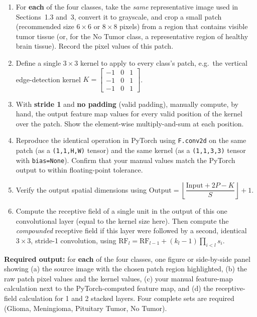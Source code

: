 \documentclass[12pt,a4paper]{article}
\begin{document}
\begin{stepbox}
\begin{enumerate}[leftmargin=*, label=\arabic*.]
  \item For \textbf{each} of the four classes, take the \emph{same} representative
        image used in Sections~1.3 and~3, convert it to grayscale, and crop a small
        patch (recommended size $6 \times 6$ or $8 \times 8$ pixels) from a region that
        contains visible tumor tissue (or, for the No Tumor class, a representative
        region of healthy brain tissue). Record the pixel values of this patch.
  \item Define a single $3 \times 3$ kernel to apply to every class's patch, e.g.\ the
        vertical edge-detection kernel
        $K = \begin{bmatrix}-1 & 0 & 1\\ -1 & 0 & 1\\ -1 & 0 & 1\end{bmatrix}$.
  \item With \textbf{stride 1} and \textbf{no padding} (valid padding), manually
        compute, by hand, the output feature map values for every valid position of
        the kernel over the patch. Show the element-wise multiply-and-sum at each
        position.
  \item Reproduce the identical operation in PyTorch using \texttt{F.conv2d} on the
        same patch (as a \texttt{(1,1,H,W)} tensor) and the same kernel (as a
        \texttt{(1,1,3,3)} tensor with \texttt{bias=None}). Confirm that your manual
        values match the PyTorch output to within floating-point tolerance.
  \item Verify the output spatial dimensions using
        $\text{Output} = \left\lfloor \dfrac{\text{Input} + 2P - K}{S} \right\rfloor + 1$.
  \item Compute the receptive field of a single unit in the output of this one
        convolutional layer (equal to the kernel size here). Then compute the
        \emph{compounded} receptive field if this layer were followed by a second,
        identical $3\times3$, stride-1 convolution, using
        $\text{RF}_l = \text{RF}_{l-1} + (k_l - 1)\prod_{i<l} s_i$.
\end{enumerate}
\end{stepbox}

\begin{notebox}
\textbf{Required output:} for \textbf{each} of the four classes, one figure or
side-by-side panel showing (a) the source image with the chosen patch region
highlighted, (b) the raw patch pixel values and the kernel values, (c) your manual
feature-map calculation next to the PyTorch-computed feature map, and (d) the
receptive-field calculation for 1 and 2 stacked layers. Four complete sets are
required (Glioma, Meningioma, Pituitary Tumor, No Tumor).
\end{notebox}
\end{document}
